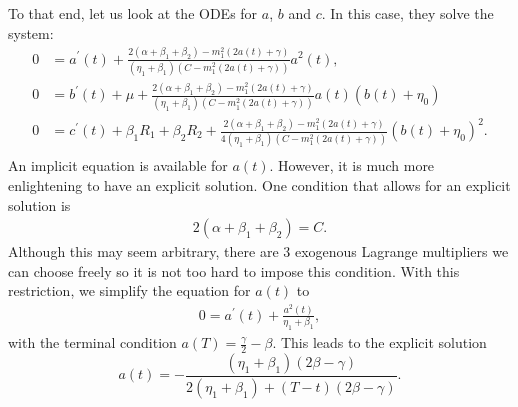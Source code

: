 \documentclass[12pt, letterpaper]{article}
\numberwithin{equation}{section}
\numberwithin{theorem}{section}
\begin{document}
To that end, let us look at the ODEs for $a$, $b$ and $c$. In this case, they solve the system:
\begin{equation}
\begin{aligned}
0&=a^\prime(t)+\frac{2(\alpha+\beta_1+\beta_2)-m_1^2(2a(t)+\gamma)}{(\eta_1+\beta_1)(C-m_1^2(2a(t)+\gamma))}a^2(t),\\
0&=b^\prime(t)+\mu+\frac{2(\alpha+\beta_1+\beta_2)-m_1^2(2a(t)+\gamma)}{(\eta_1+\beta_1)(C-m_1^2(2a(t)+\gamma))}a(t)(b(t)+\eta_0)\\
0&=c^\prime(t)+\beta_1R_1+\beta_2R_2+\frac{2(\alpha+\beta_1+\beta_2)-m_1^2(2a(t)+\gamma)}{4(\eta_1+\beta_1)(C-m_1^2(2a(t)+\gamma))}(b(t)+\eta_0)^2.\\
\end{aligned}
\end{equation}
An implicit equation is available for $a(t)$. However, it is much more enlightening to have an explicit solution. One condition that allows for an explicit solution is
\begin{equation}
\begin{aligned}
2(\alpha+\beta_1+\beta_2)=C.
\end{aligned}
\end{equation}
Although this may seem arbitrary, there are 3 exogenous Lagrange multipliers we can choose freely so it is not too hard to impose this condition. With this restriction, we simplify the equation for $a(t)$ to
\begin{equation}
\begin{aligned}
0=a^\prime(t)+\frac{a^2(t)}{\eta_1+\beta_1},
\end{aligned}
\end{equation}
with the terminal condition $a(T)=\frac{\gamma}{2}-\beta$. This leads to the explicit solution
\begin{equation}\label{atexpli}
a(t)=-\frac{\left(\eta_1+\beta_1\right)\left(2\beta-\gamma\right)}{2\left(\eta_1+\beta_1\right)+(T-t)\left(2\beta-\gamma\right)}.
\end{equation}
\end{document}
